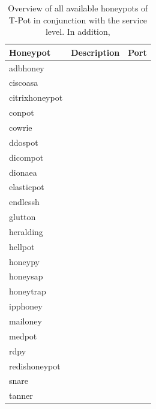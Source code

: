 \begin{table}[h]
    \centering
    \caption[Overview honeypots of T-Pot]{Overview of all available honeypots of T-Pot in conjunction with the service level. In addition, }
    \begin{tabularx}{\linewidth}{l|l|l}
        \toprule
        \textbf{Honeypot}                                 & \textbf{Description} & \textbf{Port} \\
        \hline
        adbhoney                                 &             &      \\
        ciscoasa \cite{cymmetria2018}            &             &      \\
        citrixhoneypot \cite{citrixhoneypot2020} &             &      \\
        conpot \cite{conpot2021}                 &             &      \\
        cowrie \cite{cowire2021}                 &             &      \\
        ddospot \cite{ddosspot2021}              &             &      \\
        dicompot \cite{dicompot2021}             &             &      \\
        dionaea \cite{dionaea2021}               &             &      \\
        elasticpot \cite{elasticpot2021}         &             &      \\
        endlessh \cite{endlessh2021}             &             &      \\
        glutton \cite{glutton2021}               &             &      \\
        heralding \cite{heralding2021}           &             &      \\
        hellpot \cite{hellpot2021}               &             &      \\
        honeypy \cite{honeysap2021}              &             &      \\
        honeysap \cite{honeysap2021}             &             &      \\
        honeytrap \cite{honeytrap2021}           &             &      \\
        ipphoney \cite{ipphoney2021}             &             &      \\
        mailoney                                 &             &      \\
        medpot \cite{medpot2021}                 &             &      \\
        rdpy \cite{rdpy2021}                     &             &      \\
        redishoneypot                            &             &      \\
        snare \cite{snare2021}                   &             &      \\
        tanner \cite{tanner2021}                 &             &      \\
        \bottomrule
    \end{tabularx}
    \label{tab:overview-honeypots}
\end{table}

